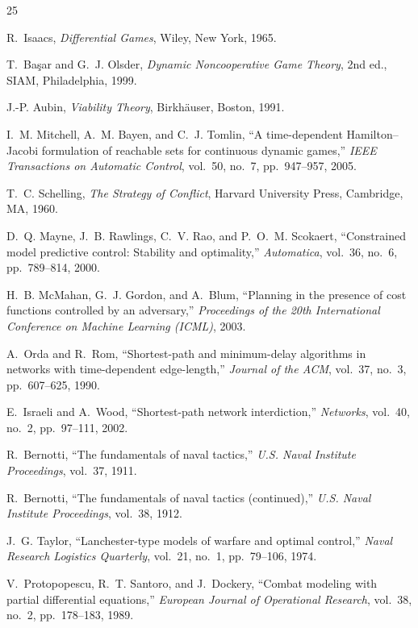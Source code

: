 \documentclass[12pt,a4paper]{article}
\begin{document}

\begin{thebibliography}{25}

R.~Isaacs, \emph{Differential Games}, Wiley, New York, 1965.

T.~Ba{\c s}ar and G.~J. Olsder, \emph{Dynamic Noncooperative Game
Theory}, 2nd ed., SIAM, Philadelphia, 1999.

J.-P. Aubin, \emph{Viability Theory}, Birkh\"auser, Boston, 1991.

I.~M. Mitchell, A.~M. Bayen, and C.~J. Tomlin, ``A time-dependent
Hamilton--Jacobi formulation of reachable sets for continuous dynamic
games,'' \emph{IEEE Transactions on Automatic Control}, vol.~50, no.~7,
pp.~947--957, 2005.

T.~C. Schelling, \emph{The Strategy of Conflict}, Harvard University
Press, Cambridge, MA, 1960.

D.~Q. Mayne, J.~B. Rawlings, C.~V. Rao, and P.~O.~M. Scokaert,
``Constrained model predictive control: Stability and optimality,''
\emph{Automatica}, vol.~36, no.~6, pp.~789--814, 2000.

H.~B. McMahan, G.~J. Gordon, and A.~Blum, ``Planning in the presence of
cost functions controlled by an adversary,'' \emph{Proceedings of the
20th International Conference on Machine Learning (ICML)}, 2003.

A.~Orda and R.~Rom, ``Shortest-path and minimum-delay algorithms in
networks with time-dependent edge-length,'' \emph{Journal of the ACM},
vol.~37, no.~3, pp.~607--625, 1990.

E.~Israeli and A.~Wood, ``Shortest-path network interdiction,''
\emph{Networks}, vol.~40, no.~2, pp.~97--111, 2002.

R.~Bernotti, ``The fundamentals of naval tactics,'' \emph{U.S. Naval
Institute Proceedings}, vol.~37, 1911.

R.~Bernotti, ``The fundamentals of naval tactics (continued),'' \emph{U.S.
Naval Institute Proceedings}, vol.~38, 1912.

J.~G. Taylor, ``Lanchester-type models of warfare and optimal control,''
\emph{Naval Research Logistics Quarterly}, vol.~21, no.~1, pp.~79--106,
1974.

V.~Protopopescu, R.~T. Santoro, and J.~Dockery, ``Combat modeling with
partial differential equations,'' \emph{European Journal of Operational
Research}, vol.~38, no.~2, pp.~178--183, 1989.


\end{thebibliography}
\end{document}
